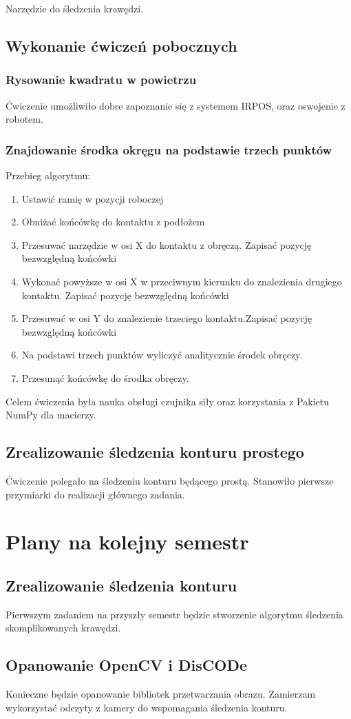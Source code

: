 \documentclass[12pt, a4paper, twoside]{book}
\begin{document}
	Narzędzie do śledzenia krawędzi.
	\section{Wykonanie ćwiczeń pobocznych}
		\subsection{Rysowanie kwadratu w powietrzu}
		Ćwiczenie umożliwiło dobre zapoznanie się z systemem IRPOS, oraz oswojenie z robotem.
		\subsection{Znajdowanie środka okręgu na podstawie trzech punktów}
		Przebieg algorytmu:
			\begin{enumerate}
			\item Ustawić ramię w pozycji roboczej
			\item Obniżać końcówkę do kontaktu z podłożem
			\item Przesuwać narzędzie w osi X do kontaktu z obręczą. Zapisać pozycję bezwzględną końcówki
			\item Wykonać powyższe w osi X w przeciwnym kierunku do znalezienia drugiego kontaktu. Zapisać pozycję bezwzględną końcówki
			\item Przesuwać w osi Y do znalezienie trzeciego kontaktu.Zapisać pozycję bezwzględną końcówki
			\item Na podstawi trzech punktów wyliczyć analitycznie środek obręczy.
			\item Przesunąć końcówkę do środka obręczy. 
			\end{enumerate}
		Celem ćwiczenia była nauka obsługi czujnika siły oraz korzystania z Pakietu NumPy dla macierzy.
	\section{Zrealizowanie śledzenia konturu prostego}
		Ćwiczenie polegało na śledzeniu konturu będącego prostą. Stanowiło pierwsze przymiarki do realizacji głównego zadania.
			
\chapter{Plany na kolejny semestr}
	\section{Zrealizowanie śledzenia konturu}
	Pierwszym zadaniem na przyszły semestr będzie stworzenie algorytmu śledzenia skomplikowanych krawędzi.
	\section{Opanowanie OpenCV i DisCODe}
	Konieczne będzie opanowanie bibliotek przetwarzania obrazu. Zamierzam wykorzystać odczyty z kamery do wspomagania śledzenia konturu.
\end{document}
